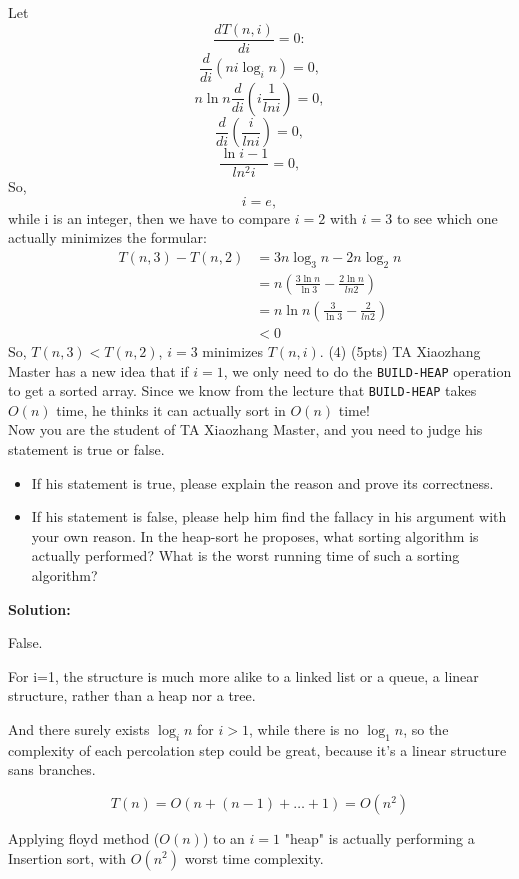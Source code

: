 \documentclass[10.5pt]{article}
\begin{document}
Let $$\frac{dT(n,i)}{di}=0:$$
$$\frac{d}{di}(ni\log_in)=0,$$
$$n\ln n\frac{d}{di}(i\frac{1}{ln i})=0,$$
$$\frac{d}{di}(\frac{i}{ln i})=0,$$
$$\frac{\ln i-1}{ln^2i}=0,$$
So, $$i=e,$$
while i is an integer, then we have to compare $i=2$ with $i=3$ to see which one actually minimizes the formular:
\begin{align*}
    T(n,3)-T(n,2) & =3n\log_3n-2n\log_2n                         \\
                  & =n(\frac{3\ln n}{\ln 3}-\frac{2\ln n}{ln 2}) \\
                  & =n\ln n(\frac{3}{\ln 3}-\frac{2}{ln 2})      \\
                  & <0
\end{align*}
So, $T(n,3)<T(n,2)$, $i=3$ minimizes $T(n,i)$.
\newpage
(4) (5pts) TA Xiaozhang Master has a new idea that if $i = 1$, we only need to do the \texttt{BUILD-HEAP} operation to get a sorted array. Since we know from the lecture that \texttt{BUILD-HEAP} takes $O(n)$ time, he thinks it can actually sort in $O(n)$ time! \\

Now you are the student of TA Xiaozhang Master, and you need to judge his statement is true or false.
\begin{itemize}
    \item{If his statement is true, please explain the reason and prove its correctness.}
    \item{If his statement is false, please help him find the fallacy in his argument with your own reason. In the heap-sort he proposes, what sorting algorithm is actually performed? What is the worst running time of such a sorting algorithm?}
\end{itemize}
\textbf{Solution:}

False.

For i=1, the structure is much more alike to a linked list or a queue, a linear structure, rather than a heap nor a tree.

And there surely exists $\log_in$ for $i>1$, while there is no $\log_1n$, so the complexity of each percolation step could be great, because it's a linear structure sans branches.

$$T(n)=O(n+(n-1)+\dots+1)=O(n^2)$$

Applying floyd method ($O(n)$) to an $i=1$ "heap" is actually performing a Insertion sort, with $O(n^2)$ worst time complexity.









\end{document}
